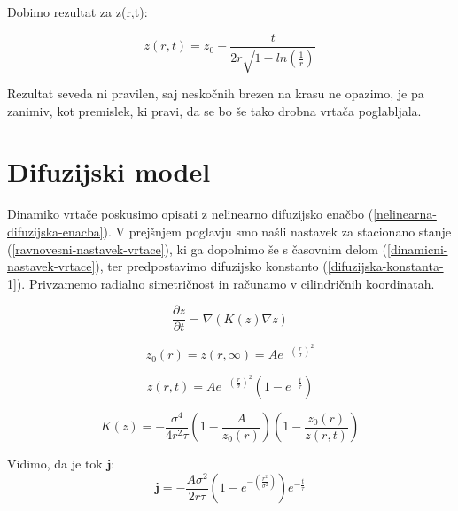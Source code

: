 \documentclass[a4paper, oneside, 12pt]{book}
\begin{document}
        Dobimo rezultat za z(r,t):

        \begin{equation}
          z(r,t) = z_0 - \frac{t}{2 r \sqrt{1-ln\left(\frac{1}{r}\right)}}
          \label{darcy-z}
        \end{equation}

        Rezultat seveda ni pravilen, saj neskočnih brezen na krasu ne opazimo, je pa zanimiv, kot premislek, ki pravi, da se bo še tako drobna vrtača poglabljala.

        \newpage

        \section{Difuzijski model}

        Dinamiko vrtače poskusimo opisati z nelinearno difuzijsko enačbo (\ref{nelinearna-difuzijska-enacba}). V prejšnjem poglavju smo našli nastavek za stacionano stanje (\ref{ravnovesni-nastavek-vrtace}), ki ga dopolnimo še s časovnim delom (\ref{dinamicni-nastavek-vrtace}), ter predpostavimo difuzijsko konstanto (\ref{difuzijska-konstanta-1}). Privzamemo radialno simetričnost in računamo v cilindričnih koordinatah.

        \begin{equation}
          \frac{\partial z}{\partial t} = \nabla (K(z) \nabla z)
          \label{nelinearna-difuzijska-enacba}
        \end{equation}

        \begin{equation}
          z_0(r) = z(r,\infty) = Ae^{-\left(\frac{r}{\sigma }\right)^2}
          \label{ravnovesni-nastavek-vrtace}
        \end{equation}

        \begin{equation}
          z(r,t) = A e^{-\left(\frac{r}{\sigma }\right)^2} \left(1- e^{-\frac{t}{\tau }}\right)
          \label{dinamicni-nastavek-vrtace}
        \end{equation}

        \begin{equation}
          K(z) = -\frac{\sigma ^4}{4 r^2 \tau } \left(1-\frac{A}{z_0(r)}\right) \left(1-\frac{z_0(r)}{z(r,t)}\right)
          \label{difuzijska-konstanta-1}
        \end{equation}

        Vidimo, da je tok $\mathbf{j}$:
        \begin{equation}
          \mathbf{j} = -\frac{A \sigma^2}{2 r \tau } \left( 1-e^{-(\frac{r^2}{\sigma ^2})} \right) e^{-\frac{t}{\tau }}
          \label{tok}
        \end{equation}
\end{document}
